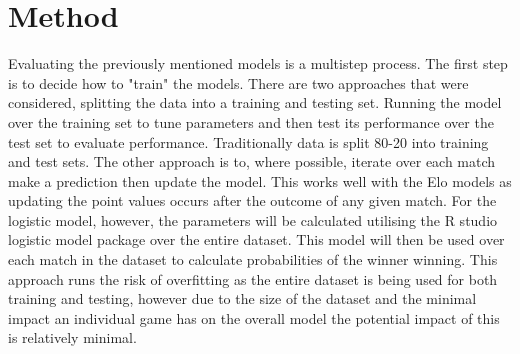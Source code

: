 \documentclass[12pt,a4paper]{article}
\begin{document}
\section{Method}
Evaluating the previously mentioned models is a multistep process. The first
step is to decide how to "train" the models. There are two approaches that were
considered, splitting the data into a training and testing set. Running the
model over the training set to tune parameters and then test its performance over
the test set to evaluate performance. Traditionally data is split 80-20 into
training and test sets.
The other approach is to, where possible, iterate over each match make a
prediction then update the model. This works well with the Elo models as
updating the point values occurs after the outcome of any given match. For
the logistic model, however, the parameters will be calculated utilising the R studio
logistic model package over the entire dataset. This model will then be used over each
match in the dataset to calculate probabilities of the winner winning. This
approach runs the risk of overfitting as the entire dataset is being used for
both training and testing, however due to the size of the dataset and the minimal
impact an individual game has on the overall model the potential impact of this is
relatively minimal.
\end{document}
